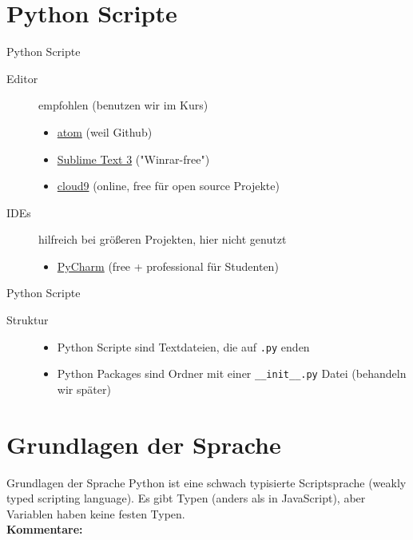 \section{Python Scripte}
\begin{frame}{Python Scripte}
\begin{description}
   	\item[Editor] empfohlen (benutzen wir im Kurs)
    \begin{itemize}
        \item \href{https://atom.io}{atom} (weil Github)
        \item \href{http://www.sublimetext.com/3}{Sublime Text 3} ("Winrar-free")
        \item \href{https://c9.i}{cloud9} (online, free für open source Projekte)
    \end{itemize}
    \item[IDEs] hilfreich bei grö\ss{}eren Projekten, hier nicht genutzt
    \begin{itemize}
       	\item \href{https://jetbrains.com/pycharm}{PyCharm} (free + professional für Studenten)
   	\end{itemize}
\end{description}
\end{frame}
\begin{frame}{Python Scripte}
\begin{description}
   	\item[Struktur]
   	\begin{itemize}
       	\item Python Scripte sind Textdateien, die auf \texttt{.py} enden
        \item Python Packages sind Ordner mit einer \texttt{\_\_init\_\_.py} Datei (behandeln wir später)
    \end{itemize}
\end{description}
\end{frame}


\section{Grundlagen der Sprache}
\begin{frame}[fragile]{Grundlagen der Sprache}
    Python ist eine schwach typisierte Scriptsprache (weakly typed scripting language). Es gibt Typen (anders als in JavaScript), aber Variablen haben keine festen Typen.\\

    \textbf{Kommentare:}
    
\end{frame}

